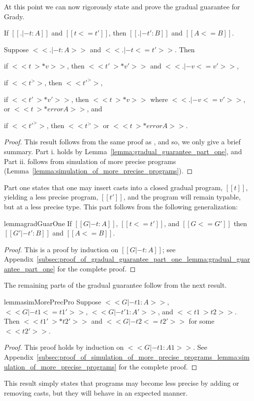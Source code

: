 At this point we can now rigorously state and prove the gradual
guarantee for Grady.
\begin{theorem}
  \label{thm:gradual_guarantee} 
  \begin{enumR}
  \item[] 
  \item If $[[. |- t : A]]$ and $[[t <= t']]$, then $[[. |- t' : B]]$ and $[[A <= B]]$.
  \item Suppose $<<. |- t : A>>$ and $<<. |- t <= t'>>$. Then
    \begin{enumA}
    \item if $<<t ~>* v>>$, then $<<t' ~>* v'>>$ and $<<. |- v <= v'>>$,
    \item if $<<t ^>>$, then $<<t' ^>>$,
    \item if $<<t' ~>* v'>>$, then $<<t ~>* v>>$ where $<<. |- v <= v'>>$, or $<<t ~>* error A>>$, and
    \item if $<<t' ^>>$, then $<<t ^>>$ or $<<t ~>* error A>>$.
    \end{enumA}
  \end{enumR}
\end{theorem}
\begin{proof}
  This result follows from the same proof as \cite{Siek:2015}, and so,
  we only give a brief summary.  Part i. holds by
  Lemma~\ref{lemma:gradual_guarantee_part_one}, and Part ii. follows
  from simulation of more precise programs
  (Lemma~\ref{lemma:simulation_of_more_precise_programs}).
\end{proof}
Part one states that one may insert casts into a closed gradual
program, $[[t]]$, yielding a less precise program, $[[t']]$, and the
program will remain typable, but at a less precise type.  This part
follows from the following generalization:
\begin{restatable}{lemma}{gradGuarOne}
  \label{lemma:gradual_guarantee_part_one}
  If $[[G |- t : A]]$, $[[t <= t']]$, and $[[G <= G']]$ then $[[G' |- t' : B]]$ and $[[A <= B]]$.
\end{restatable}
\begin{proof}
  This is a proof by induction on $[[G |- t : A]]$; see
  Appendix~\ref{subsec:proof_of_gradual_guarantee_part_one_lemma:gradual_guarantee_part_one}
  for the complete proof.
\end{proof}
\noindent
The remaining parts of the gradual guarantee follow from the next
result.
\begin{restatable}{lemma}{simMorePrecPro}
  \label{lemma:simulation_of_more_precise_programs}
  Suppose $<<G |- t1 : A>>$, $<<G |- t1 <= t1'>>$, $<<G |- t'1 : A'>>$, and $<<t1 ~> t2>>$.
  Then $<<t1' ~>* t2'>>$ and $<<G |- t2 <= t2'>>$ for some $<<t2'>>$.
\end{restatable}
\begin{proof}
  This proof holds by induction on $<<G |- t1 : A1>>$.  See
  Appendix~\ref{subsec:proof_of_simulation_of_more_precise_programs_lemma:simulation_of_more_precise_programs}
  for the complete proof.
\end{proof}
\noindent
This result simply states that programs may become less precise by
adding or removing casts, but they will behave in an expected manner.

